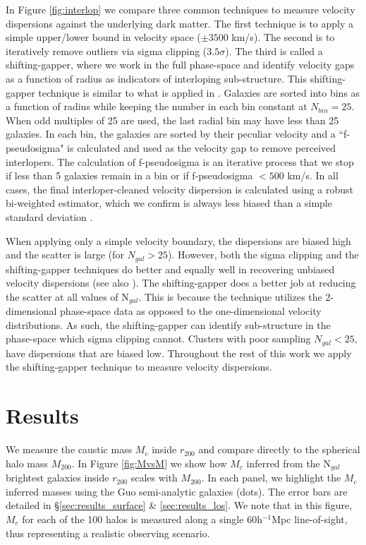 \documentclass[iop]{emulateapj}
\begin{document}
In Figure \ref{fig:interlop} we compare three common techniques to measure velocity dispersions against the underlying dark matter. The first technique is to apply a simple upper/lower bound in velocity space ($\pm 3500$ km/s). The second is to iteratively remove outliers via sigma clipping ($3.5\sigma$). The third is called a shifting-gapper, where we work in the full phase-space and identify velocity gaps as a function of radius as indicators of interloping sub-structure. This shifting-gapper technique is similar to what is applied in \citet{Wing11}. Galaxies are sorted into bins as a function of radius while keeping the number in each bin constant at $N_{bin}=25$. When odd multiples of 25 are used, the last radial bin may have less than 25 galaxies. In each bin, the galaxies are sorted by their peculiar velocity and a ``f-pseudosigma" \citep{Beers90} is calculated and used as the velocity gap to remove perceived interlopers. The calculation of f-pseudosigma is an iterative process that we stop if less than 5 galaxies remain in a bin or if f-pseudosigma $< 500$ km/s. In all cases, the final interloper-cleaned velocity dispersion is calculated using a robust bi-weighted estimator, which we confirm is always less biased than a simple standard deviation \citep{Beers90}.

When applying only a simple velocity boundary, the dispersions are biased high and the scatter is large (for $N_{gal} > 25$). However, both the sigma clipping and the shifting-gapper techniques do better and equally well in recovering unbiased velocity dispersions (see also \cite{Saro12}). The shifting-gapper does a better job at reducing the scatter at all values of N$_{gal}$. This is because the technique utilizes the 2-dimensional phase-space data as opposed to the one-dimensional velocity distributions. As such, the shifting-gapper can identify sub-structure in the phase-space which sigma clipping cannot.  Clusters with poor sampling $N_{gal} < 25$, have dispersions that are biased low. Throughout the rest of this work we apply the shifting-gapper technique to measure velocity dispersions.

\section{Results}
\label{sec:results}

We measure the caustic mass $M_{c}$ inside $r_{200}$ and compare directly to the spherical halo mass $M_{200}$. In Figure \ref{fig:MvsM} we show how $M_{c}$ inferred from the N$_{gal}$ brightest galaxies inside $r_{200}$ scales with $M_{200}$. In each panel, we highlight the $M_c$ inferred masses using the Guo semi-analytic galaxies (dots). The error bars are detailed in \S \ref{sec:results_surface} \& \ref{sec:results_los}. We note that in this figure, $M_{c}$ for each of the 100 halos is measured along a single 60h$^{-1}$Mpc line-of-sight, thus representing a realistic observing scenario.
\end{document}
